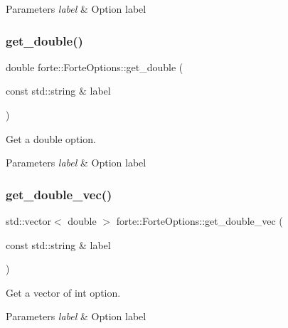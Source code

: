 \begin{DoxyParams}{Parameters}
{\em label} & Option label \\
\hline
\end{DoxyParams}
\mbox{\label{classforte_1_1_forte_options_a40f154eb54ccc9ad7654009d327c7b9a}} 
\subsubsection{\texorpdfstring{get\+\_\+double()}{get\_double()}}
{\footnotesize\ttfamily double forte\+::\+Forte\+Options\+::get\+\_\+double (\begin{DoxyParamCaption}\item[{const std\+::string \&}]{label }\end{DoxyParamCaption})}



Get a double option. 


\begin{DoxyParams}{Parameters}
{\em label} & Option label \\
\hline
\end{DoxyParams}
\mbox{\label{classforte_1_1_forte_options_ab0470ac133ac57968be2c4ac780bc91c}} 
\subsubsection{\texorpdfstring{get\+\_\+double\+\_\+vec()}{get\_double\_vec()}}
{\footnotesize\ttfamily std\+::vector$<$ double $>$ forte\+::\+Forte\+Options\+::get\+\_\+double\+\_\+vec (\begin{DoxyParamCaption}\item[{const std\+::string \&}]{label }\end{DoxyParamCaption})}



Get a vector of int option. 


\begin{DoxyParams}{Parameters}
{\em label} & Option label \\
\hline
\end{DoxyParams}
\mbox{\label{classforte_1_1_forte_options_adfc4856975eff33632ea936f8e58f394}} 
